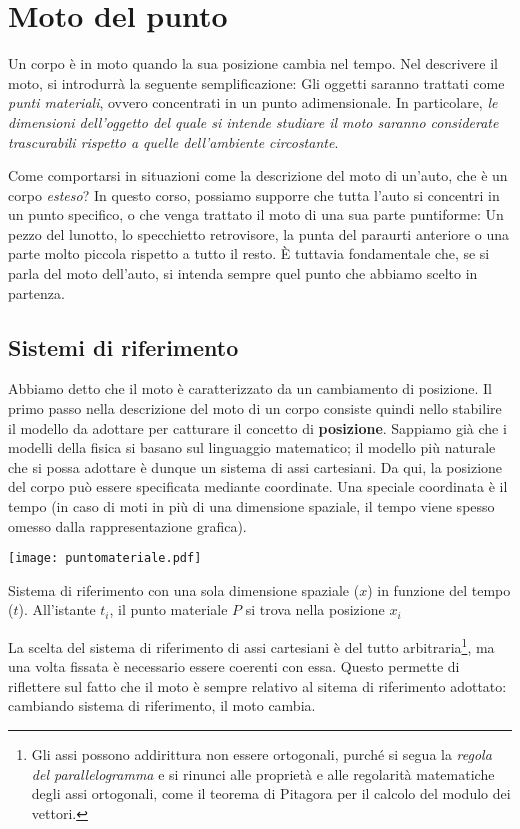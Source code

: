 \marginpar{\minitoc}

\section{Moto del punto}
Un corpo è in moto quando la sua posizione cambia nel tempo. Nel descrivere il
moto, si introdurrà la seguente semplificazione: Gli oggetti saranno
trattati come \textit{punti materiali}, ovvero concentrati in un punto
adimensionale. In particolare, \textit{le dimensioni dell'oggetto del quale si
intende studiare il moto saranno considerate trascurabili rispetto a quelle
dell'ambiente circostante}.

Come comportarsi in situazioni come la descrizione del moto di un'auto, che è
un corpo \textit{esteso}? In questo corso, possiamo supporre che tutta l'auto
si concentri in un punto specifico, o che venga trattato il moto di una sua
parte puntiforme: Un pezzo del lunotto, lo specchietto retrovisore, la punta del
paraurti anteriore o una parte molto piccola rispetto a tutto il resto. È tuttavia fondamentale che, se si
parla del moto dell'auto, si intenda sempre quel punto che abbiamo scelto in partenza.

\subsection{Sistemi di riferimento}
Abbiamo detto che il moto è caratterizzato da un cambiamento di posizione. Il primo
passo nella descrizione del moto di un corpo consiste quindi nello stabilire il
modello da adottare per catturare il concetto di \textbf{posizione}. Sappiamo già
che i modelli della fisica si basano sul linguaggio matematico; il modello più
naturale che si possa adottare è dunque un sistema di assi cartesiani. Da qui, la
posizione del corpo può essere specificata mediante coordinate. Una speciale
coordinata è il tempo (in caso di moti in più di una dimensione spaziale, il
tempo viene spesso omesso dalla rappresentazione grafica).

\begin{marginfigure}
    \centering
    \texttt{[image: puntomateriale.pdf]}
    \caption{Sistema di riferimento con una sola dimensione spaziale ($x$)
    in funzione del tempo ($t$). All'istante $t_i$, il punto materiale $P$
    si trova nella posizione $x_i$}
    \label{point}
\end{marginfigure}

La scelta del sistema di riferimento di assi cartesiani è del tutto arbitraria\footnote{
Gli assi possono addirittura non essere ortogonali, purché si segua la \textit{regola del
parallelogramma} e si rinunci alle proprietà e alle regolarità matematiche degli
assi ortogonali, come il teorema di Pitagora per il calcolo del modulo dei
vettori.}, ma una volta fissata è necessario essere coerenti con essa.
Questo permette di riflettere sul fatto che il moto è sempre relativo al sitema di
riferimento adottato: cambiando sistema di riferimento, il moto cambia.

